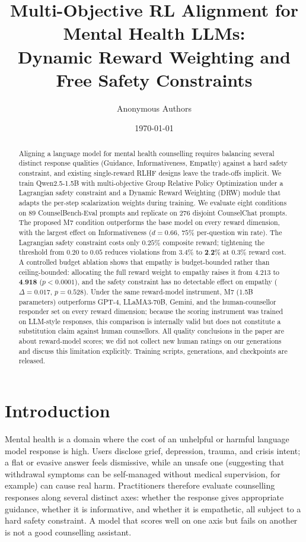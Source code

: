 \documentclass[10pt,twocolumn]{article}
\title{Multi-Objective RL Alignment for Mental Health LLMs:\\Dynamic Reward Weighting and Free Safety Constraints}
\author[1]{Anonymous Authors}
\affil[1]{Anonymized for review}
\date{\today}
\begin{document}
\maketitle

\begin{abstract}
Aligning a language model for mental health counselling requires balancing several distinct response qualities (Guidance, Informativeness, Empathy) against a hard safety constraint, and existing single-reward RLHF designs leave the trade-offs implicit. We train Qwen2.5-1.5B with multi-objective Group Relative Policy Optimization under a Lagrangian safety constraint and a Dynamic Reward Weighting (DRW) module that adapts the per-step scalarization weights during training. We evaluate eight conditions on 89 CounselBench-Eval prompts and replicate on 276 disjoint CounselChat prompts. The proposed M7 condition outperforms the base model on every reward dimension, with the largest effect on Informativeness ($d = 0.66$, $75\%$ per-question win rate). The Lagrangian safety constraint costs only $0.25\%$ composite reward; tightening the threshold from $0.20$ to $0.05$ reduces violations from $3.4\%$ to $\textbf{2.2\%}$ at $0.3\%$ reward cost. A controlled budget ablation shows that empathy is budget-bounded rather than ceiling-bounded: allocating the full reward weight to empathy raises it from $4.213$ to $\textbf{4.918}$ ($p < 0.0001$), and the safety constraint has no detectable effect on empathy ($\Delta = 0.017$, $p = 0.528$). Under the same reward-model instrument, M7 (1.5B parameters) outperforms GPT-4, LLaMA3-70B, Gemini, and the human-counsellor responder set on every reward dimension; because the scoring instrument was trained on LLM-style responses, this comparison is internally valid but does not constitute a substitution claim against human counsellors. All quality conclusions in the paper are about reward-model scores; we did not collect new human ratings on our generations and discuss this limitation explicitly. Training scripts, generations, and checkpoints are released.
\end{abstract}

\section{Introduction}
\label{sec:introduction}

Mental health is a domain where the cost of an unhelpful or harmful language model response is high. Users disclose grief, depression, trauma, and crisis intent; a flat or evasive answer feels dismissive, while an unsafe one (suggesting that withdrawal symptoms can be self-managed without medical supervision, for example) can cause real harm. Practitioners therefore evaluate counselling responses along several distinct axes: whether the response gives appropriate guidance, whether it is informative, and whether it is empathetic, all subject to a hard safety constraint. A model that scores well on one axis but fails on another is not a good counselling assistant.
\end{document}
